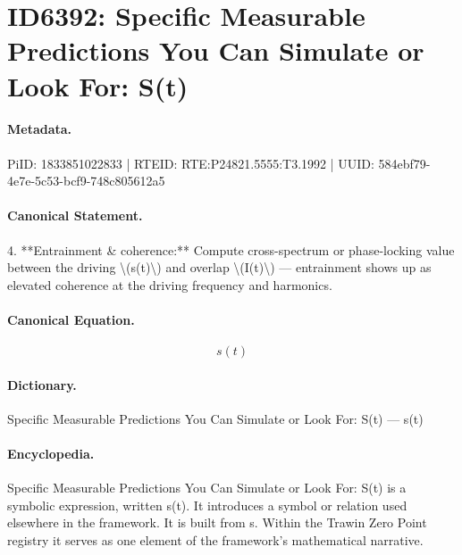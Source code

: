 \section*{ID6392: Specific Measurable Predictions You Can Simulate or Look For: S(t)}
\paragraph{Metadata.}
PiID: 1833851022833 | RTEID: RTE:P24821.5555:T3.1992 | UUID: 584ebf79-4e7e-5c53-bcf9-748c805612a5

\paragraph{Canonical Statement.}
4. **Entrainment \& coherence:** Compute cross-spectrum or phase-locking value between the driving \textbackslash{}(s(t)\textbackslash{}) and overlap \textbackslash{}(I(t)\textbackslash{}) — entrainment shows up as elevated coherence at the driving frequency and harmonics.

\paragraph{Canonical Equation.}
\[
s(t)
\]

\paragraph{Dictionary.}
Specific Measurable Predictions You Can Simulate or Look For: S(t) — s(t)

\paragraph{Encyclopedia.}
Specific Measurable Predictions You Can Simulate or Look For: S(t) is a symbolic expression, written s(t). It introduces a symbol or relation used elsewhere in the framework. It is built from s. Within the Trawin Zero Point registry it serves as one element of the framework's mathematical narrative.
